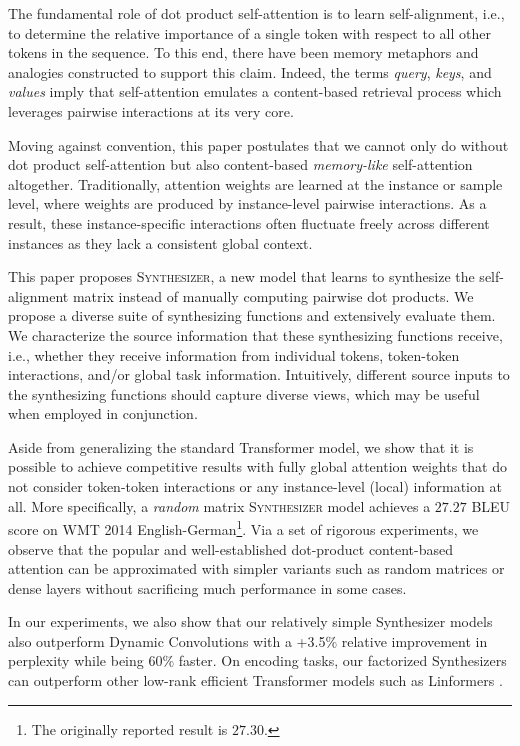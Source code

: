 The fundamental role of dot product self-attention is to learn self-alignment, i.e., to determine the relative importance of a single token with respect to all other tokens in the sequence. To this end, there have been memory metaphors and analogies constructed to support this claim. Indeed, the terms \textit{query}, \textit{keys}, and \textit{values} imply that self-attention emulates a content-based retrieval process which leverages pairwise interactions at its very core. 

Moving against convention, this paper postulates that we cannot only do without dot product self-attention but also content-based \textit{memory-like} self-attention altogether. Traditionally, attention weights are learned at the instance or sample level, where weights are produced by instance-level pairwise interactions. As a result, these instance-specific interactions often fluctuate freely across different instances as they lack a consistent global context.

This paper proposes \textsc{Synthesizer}, a new model that learns to synthesize the self-alignment matrix instead of manually computing pairwise dot products. We propose a diverse suite of synthesizing functions and extensively evaluate them. We characterize the source information that these synthesizing functions receive, i.e., whether they receive information from individual tokens, token-token interactions, and/or global task information. Intuitively, different source inputs to the synthesizing functions should capture diverse views, which may be useful when employed in conjunction.

Aside from generalizing the standard Transformer model, we show that it is possible to achieve competitive results with fully global attention weights that do not consider token-token interactions or any instance-level (local) information at all. More specifically, a \emph{random} matrix \textsc{Synthesizer} model achieves a $27.27$ BLEU score on WMT 2014 English-German\footnote{The originally reported result is $27.30$.}. Via a set of rigorous experiments, we observe that the popular and well-established dot-product content-based attention can be approximated with simpler variants such as random matrices or dense layers without sacrificing much performance in some cases. 

In our experiments, we also show that our relatively simple Synthesizer models also outperform Dynamic Convolutions \citep{wu2019pay} with a +3.5$\%$ relative improvement in perplexity while being $60\%$ faster. On encoding tasks, our factorized Synthesizers can outperform other low-rank efficient Transformer models such as Linformers \citep{wang2020linformer}.

